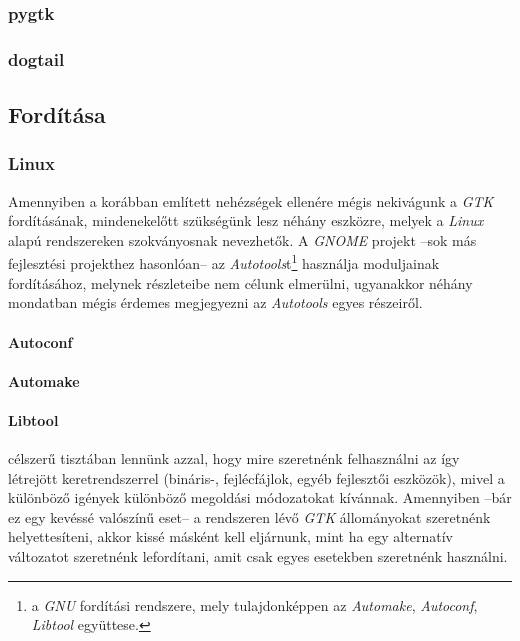 \subsubsection{pygtk}

\subsubsection{dogtail}

\subsection{Fordítása}

\subsubsection{Linux}

Amennyiben a korábban említett nehézségek ellenére mégis nekivágunk a \textit{GTK} fordításának, mindenekelőtt szükségünk lesz néhány eszközre, melyek a \textit{Linux} alapú rendszereken szokványosnak nevezhetők. A \textit{GNOME} projekt --sok más fejlesztési projekthez hasonlóan-- az \textit{Autotools}t\footnote{a \textit{GNU} fordítási rendszere, mely tulajdonképpen az \textit{Automake}, \textit{Autoconf}, \textit{Libtool} együttese.} használja moduljainak fordításához, melynek részleteibe nem célunk elmerülni, ugyanakkor néhány mondatban mégis érdemes megjegyezni az \textit{Autotools} egyes részeiről.

\paragraph{Autoconf}
\paragraph{Automake}
\paragraph{Libtool}

célszerű tisztában lennünk azzal, hogy mire szeretnénk felhasználni az így létrejött keretrendszerrel (bináris-, fejlécfájlok, egyéb fejlesztői eszközök), mivel a különböző igények különböző megoldási módozatokat kívánnak. Amennyiben --bár ez egy kevéssé valószínű eset-- a rendszeren lévő \textit{GTK} állományokat szeretnénk helyettesíteni, akkor kissé másként kell eljárnunk, mint ha egy alternatív változatot szeretnénk lefordítani, amit csak egyes esetekben szeretnénk használni.




